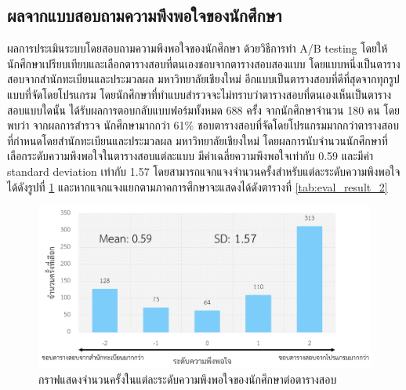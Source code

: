 \subsection{ผลจากแบบสอบถามความพึงพอใจของนักศึกษา}
ผลการประเมินระบบโดยสอบถามความพึงพอใจของนักศึกษา ด้วยวิธีการทำ A/B testing 
โดยให้นักศึกษาเปรียบเทียบและเลือกตารางสอบที่ตนเองชอบจากตารางสอบสองแบบ โดยแบบหนึ่งเป็นตารางสอบจากสำนักทะเบียนและประมวลผล มหาวิทยาลัยเชียงใหม่ 
อีกแบบเป็นตารางสอบที่ดีที่สุดจากทุกรูปแบบที่จัดโดยโปรแกรม โดยนักศึกษาที่ทำแบบสำรวจจะไม่ทราบว่าตารางสอบที่ตนเองเห็นเป็นตารางสอบแบบใดนั้น 
ได้รับผลการตอบกลับแบบฟอร์มทั้งหมด 688 ครั้ง จากนักศึกษาจำนวน 180 คน
โดยพบว่า จากผลการสำรวจ นักศึกษามากกว่า 61\% ชอบตารางสอบที่จัดโดยโปรแกรมมากกว่าตารางสอบที่กำหนดโดยสำนักทะเบียนและประมวลผล มหาวิทยาลัยเชียงใหม่
โดยผลการนับจำนวนนักศึกษาที่เลือกระดับความพึงพอใจในตารางสอบแต่ละแบบ มีค่าเฉลี่ยความพึงพอใจเท่ากับ 0.59 และมีค่า standard deviation เท่ากับ 1.57 
โดยสามารถแจกแจงจำนวนครั้งสำหรับแต่ละระดับความพึงพอใจได้ดังรูปที่ \ref{fig:eval_result_1} และหากแจกแจงแยกตามภาคการศึกษาจะแสดงได้ดังตารางที่ \ref{tab:eval_result_2} 
\begin{figure}
    \begin{center}
      \includegraphics[width=\linewidth]{images/eval_result_1.png}
    \end{center}
    \caption[กราฟแสดงจำนวนครั้งในแต่ละระดับความพึงพอใจของนักศึกษาต่อตารางสอบ]{กราฟแสดงจำนวนครั้งในแต่ละระดับความพึงพอใจของนักศึกษาต่อตารางสอบ}
    \label{fig:eval_result_1}     
\end{figure}
